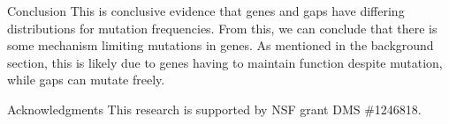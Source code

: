 \documentclass[final]{beamer}
\begin{document}
\begin{frame}{}
\begin{columns}[t]
\begin{column}{.32 \linewidth}
\begin{block}{\large Conclusion}
This is conclusive evidence that genes and gaps have differing distributions for mutation frequencies. From this, we can conclude that there is some mechanism limiting mutations in genes. As mentioned in the background section, this is likely due to genes having to maintain function despite mutation, while gaps can mutate freely.



\end{block}


	
	  \begin{block}{Acknowledgments}
This research is supported by NSF grant DMS \#1246818.
	 \end{block}



        \end{column}

    \end{columns}

  \end{frame}
\end{document}
